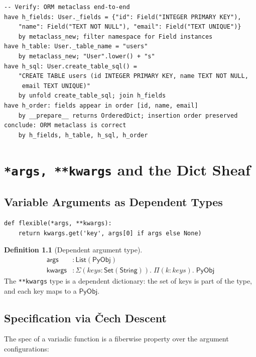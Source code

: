 \documentclass[11pt,a4paper]{report}
\theoremstyle{definition}
\newtheorem{definition}{Definition}[chapter]
\theoremstyle{plain}
\newcommand{\PyObj}{\mathsf{PyObj}}
\begin{document}
\begin{lstlisting}[style=proof]
-- Verify: ORM metaclass end-to-end
have h_fields: User._fields = {"id": Field("INTEGER PRIMARY KEY"),
    "name": Field("TEXT NOT NULL"), "email": Field("TEXT UNIQUE")}
    by metaclass_new; filter namespace for Field instances
have h_table: User._table_name = "users"
    by metaclass_new; "User".lower() + "s"
have h_sql: User.create_table_sql() =
    "CREATE TABLE users (id INTEGER PRIMARY KEY, name TEXT NOT NULL,
     email TEXT UNIQUE)"
    by unfold create_table_sql; join h_fields
have h_order: fields appear in order [id, name, email]
    by __prepare__ returns OrderedDict; insertion order preserved
conclude: ORM metaclass is correct
    by h_fields, h_table, h_sql, h_order
\end{lstlisting}


\chapter{\texttt{*args, **kwargs} and the Dict Sheaf}
\label{ch:args-kwargs}

\section{Variable Arguments as Dependent Types}

\begin{lstlisting}[style=python]
def flexible(*args, **kwargs):
    return kwargs.get('key', args[0] if args else None)
\end{lstlisting}

\begin{definition}[Dependent argument type]
\begin{align}
  \mathsf{args} &: \mathsf{List}(\PyObj) \\
  \mathsf{kwargs} &: \Sigma(\mathit{keys} : \mathsf{Set}(\mathsf{String})).\;
    \Pi(k : \mathit{keys}).\; \PyObj
\end{align}
The \texttt{**kwargs} type is a dependent dictionary: the set of keys is part of
the type, and each key maps to a $\PyObj$.
\end{definition}

\section{Specification via \v{C}ech Descent}

The spec of a variadic function is a fiberwise property over the argument
configurations:
\end{document}

